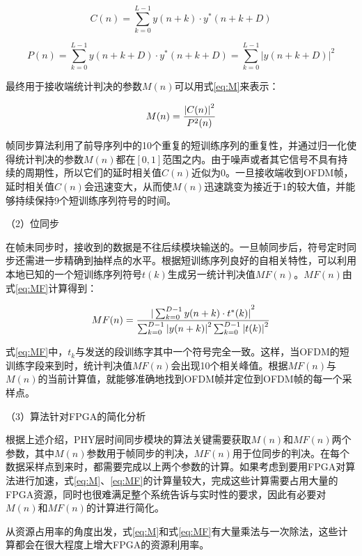\documentclass[titlepage]{article}
\numberwithin{figure}{section}
\numberwithin{equation}{section}
\begin{document}
\begin{equation}\label{eq:C}
C(n)=\sum_{k=0}^{L-1}y(n+k)\cdot y^{*}(n+k+D)
\end{equation}

\begin{equation}\label{eq:P}
P(n)=\sum_{k=0}^{L-1}y(n+k+D)\cdot y^{*}(n+k+D)=\sum_{k=0}^{L-1}{|y(n+k+D)|}^2
\end{equation}

最终用于接收端统计判决的参数$M(n)$可以用式\ref{eq:M}来表示：

\begin{equation}\label{eq:M}
M(n)={{|C(n)|}^{2}\over P^{2}(n)}
\end{equation}

帧同步算法利用了前导序列中的10个重复的短训练序列的重复性，并通过归一化使得统计判决的参数$M(n)$都在$[0,1]$范围之内。由于噪声或者其它信号不具有持续的周期性，所以它们的延时相关值$C(n)$近似为$0$。一旦接收端收到OFDM帧，延时相关值$C(n)$会迅速变大，从而使$M(n)$迅速跳变为接近于$1$的较大值，并能够持续保持9个短训练序列符号的时间。

（2）位同步

在帧未同步时，接收到的数据是不往后续模块输送的。一旦帧同步后，符号定时同步还需进一步精确到抽样点的水平。根据短训练序列良好的自相关特性，可以利用本地已知的一个短训练序列符号$t(k)$生成另一统计判决值$MF(n)$。$MF(n)$由式\ref{eq:MF}计算得到：

\begin{equation}\label{eq:MF}
MF(n)={{|\sum_{k=0}^{D-1}y(n+k)\cdot t^{*}(k)|}^{2} \over \sum_{k=0}^{D-1}{|y(n+k)|}^{2} \sum_{k=0}^{D-1}{|t(k)|}^{2}}
\end{equation}

式\ref{eq:MF}中，$t_{k}$与发送的段训练字其中一个符号完全一致。这样，当OFDM的短训练字段来到时，统计判决值$MF(n)$会出现10个相关峰值。根据$MF(n)$与$M(n)$的当前计算值，就能够准确地找到OFDM帧并定位到OFDM帧的每一个采样点。

（3）算法针对FPGA的简化分析

根据上述介绍，PHY层时间同步模块的算法关键需要获取$M(n)$和$MF(n)$两个参数，其中$M(n)$参数用于帧同步的判决，$MF(n)$用于位同步的判决。在每个数据采样点到来时，都需要完成以上两个参数的计算。如果考虑到要用FPGA对算法进行加速，式\ref{eq:M}、\ref{eq:MF}的计算量较大，完成这些计算需要占用大量的FPGA资源，同时也很难满足整个系统告诉与实时性的要求，因此有必要对$M(n)$和$MF(n)$的计算进行简化。

从资源占用率的角度出发，式\ref{eq:M}和式\ref{eq:MF}有大量乘法与一次除法，这些计算都会在很大程度上增大FPGA的资源利用率。
\end{document}
